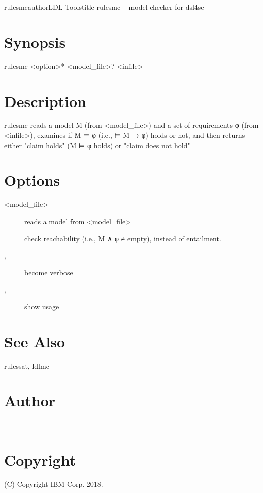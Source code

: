 \documentclass[fancy]{article}
\begin{document}
\begin{Name}{1}{rulesmc}{author}{LDL Tools}{title}
rulesmc -- model-checker for dsl4sc
\end{Name}

\section{Synopsis}
rulesmc <option>* <model_file>? <infile>

\section{Description}
rulesmc reads a model M (from <model_file>) and a set of requirements φ (from <infile>),
examines if M ⊨ φ (i.e., ⊨ M → φ) holds or not, and then
returns either "claim holds" (M ⊨ φ holds) or "claim does not hold" 

\section{Options}
\begin{description}
%
\item[ <model_file>]
reads a model from <model_file>
%
\item[]
check reachability (i.e., M ∧ φ ≠ empty), instead of entailment.
%
\item[, ]
become verbose
%
\item[, ]
show usage
\end{description}

\section{See Also}
rulessat, ldlmc

\section{Author}
\\

\section{Copyright}
(C) Copyright IBM Corp. 2018.
\end{document}
